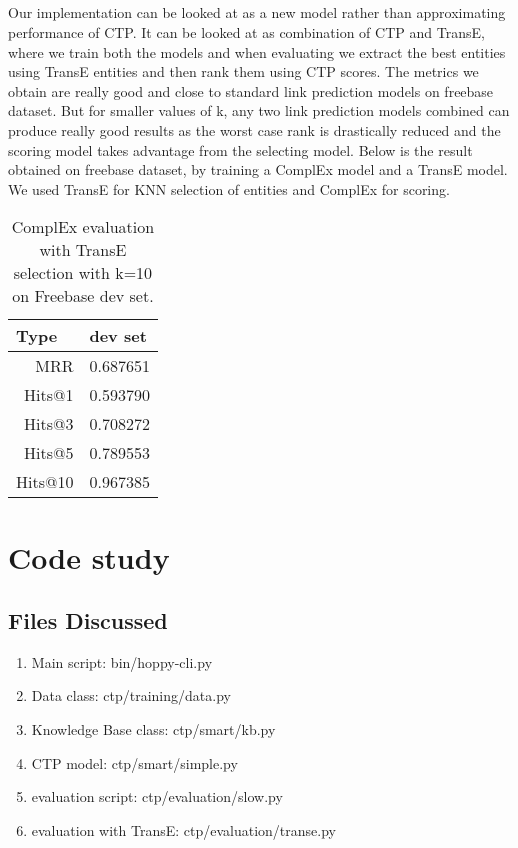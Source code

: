 \documentclass[Other]{iitddiss}
\begin{document}
\paragraph{}
Our implementation can be looked at as a new model rather than approximating performance of CTP. It can be looked at as combination of CTP and TransE, where we train both the models and when evaluating we extract the best entities using TransE entities and then rank them using CTP scores. The metrics we obtain are really good and close to standard link prediction models on freebase dataset. But for smaller values of k, any two link prediction models combined can produce really good results as the worst case rank is drastically reduced and the scoring model takes advantage from the selecting model. Below is the result obtained on freebase dataset, by training a ComplEx model and a TransE model. We used TransE for KNN selection of entities and ComplEx for scoring.

\begin{table}[H]
	\centering
	\begin{tabular}{|r|r|}
		\hline
		\multicolumn{1}{|l|}{\textbf{Type}} & \multicolumn{1}{l|}{\textbf{dev set}}  \\ \hline
		MRR		&	0.687651                              \\ \hline
		Hits@1	&	0.593790                              \\ \hline
		Hits@3	&	0.708272                              \\ \hline
		Hits@5	&	0.789553                              \\ \hline
		Hits@10	&	0.967385                              \\ \hline
	\end{tabular}
	\caption{ComplEx evaluation with TransE selection with k=10 on Freebase dev set. }
	\label{tab:transE_MRR}
\end{table}






\chapter{Code study}
\section{Files Discussed}
\begin{enumerate}
\item Main script: bin/hoppy-cli.py
\item Data class: ctp/training/data.py
\item Knowledge Base class: ctp/smart/kb.py
\item CTP model: ctp/smart/simple.py
\item evaluation script: ctp/evaluation/slow.py
\item evaluation with TransE: ctp/evaluation/transe.py
\end{enumerate}
\end{document}

